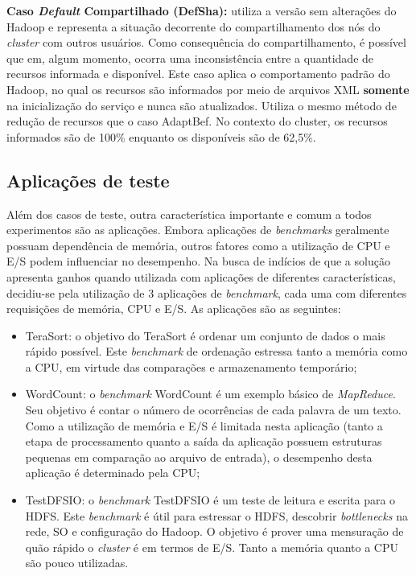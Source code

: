 \textbf{Caso \textit{Default} Compartilhado (DefSha):} utiliza a versão sem alterações do Hadoop e representa a situação decorrente do compartilhamento dos nós do \textit{cluster} com outros usuários. Como consequência do compartilhamento, é possível que em, algum momento, ocorra uma inconsistência entre a quantidade de recursos informada e disponível. Este caso aplica o comportamento padrão do Hadoop, no qual os recursos são informados por meio de arquivos XML \textbf{somente} na inicialização do serviço e nunca são atualizados. Utiliza o mesmo método de redução de recursos que o caso AdaptBef. No contexto do cluster, os recursos informados são de 100\% enquanto os disponíveis são de 62,5\%.

\subsection{Aplicações de teste}
\label{sec:aplicacoes}
Além dos casos de teste, outra característica importante e comum a todos experimentos são as aplicações. Embora aplicações de \textit{benchmarks} geralmente possuam dependência de memória, outros fatores como a utilização de CPU e E/S podem influenciar no desempenho. Na busca de indícios de que a solução apresenta ganhos quando utilizada com aplicações de diferentes características, decidiu-se pela utilização de 3 aplicações de \textit{benchmark}, cada uma com diferentes requisições de memória, CPU e E/S. As aplicações são as seguintes:

\begin{itemize}
	\item TeraSort: o objetivo do TeraSort \citet{TeraSort2008} é ordenar um conjunto de dados o mais rápido possível. Este \textit{benchmark} de ordenação estressa tanto a memória como a CPU, em virtude das comparações e armazenamento temporário;
	\item WordCount: o \textit{benchmark} WordCount é um exemplo básico de \textit{MapReduce}. Seu objetivo é contar o número de ocorrências de cada palavra de um texto. Como a utilização de memória e E/S é limitada nesta aplicação (tanto a etapa de processamento quanto a saída da aplicação possuem estruturas pequenas em comparação ao arquivo de entrada), o desempenho desta aplicação é determinado pela CPU;
	\item TestDFSIO: o \textit{benchmark} TestDFSIO é um teste de leitura e escrita para o HDFS. Este \textit{benchmark} é útil para estressar o HDFS, descobrir \textit{bottlenecks} na rede, SO e configuração do Hadoop. O objetivo é prover uma mensuração de quão rápido o \textit{cluster} é em termos de E/S. Tanto a memória quanto a CPU são pouco utilizadas.
\end{itemize}

